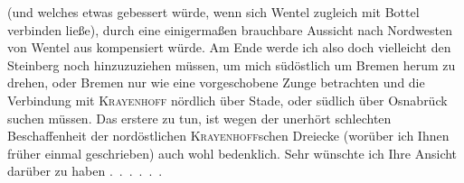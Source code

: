 \noindent (und welches etwas gebessert würde, wenn sich Wentel zugleich mit Bottel verbinden ließe), durch eine einigermaßen brauchbare Aussicht nach Nordwesten von Wentel aus kompensiert würde.
Am Ende werde ich also doch vielleicht den Steinberg noch hinzuzuziehen müssen, um mich südöstlich um Bremen herum zu drehen, oder Bremen nur wie eine vorgeschobene Zunge betrachten und die Verbindung mit \textsc{Krayenhoff} nördlich über Stade, oder südlich über Osnabrück suchen müssen.
Das erstere  zu tun, ist wegen der unerhört schlechten Beschaffenheit der nordöstlichen \textsc{Krayenhoff}schen Dreiecke (worüber ich Ihnen früher einmal geschrieben) auch wohl bedenklich.
Sehr wünschte ich Ihre Ansicht darüber zu haben .\ .\ .\ .\ .\ .
